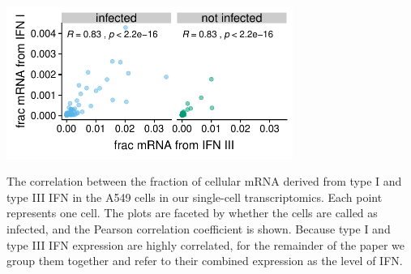 \documentclass[]{asm-article}
\begin{document}
\begin{suppfig}
\includegraphics[width=0.7\textwidth]{figures/single_cell_figures/p_ifn_genes_corr.pdf}
\caption{
The correlation between the fraction of cellular mRNA derived from type I and type III IFN in the A549 cells in our single-cell transcriptomics.
Each point represents one cell.
The plots are faceted by whether the cells are called as infected, and the Pearson correlation coefficient is shown.
Because type I and type III IFN expression are highly correlated, for the remainder of the paper we group them together and refer to their combined expression as the level of IFN.
}
\label{suppfig:type_I_III_correlation}
\end{suppfig}
\end{document}
